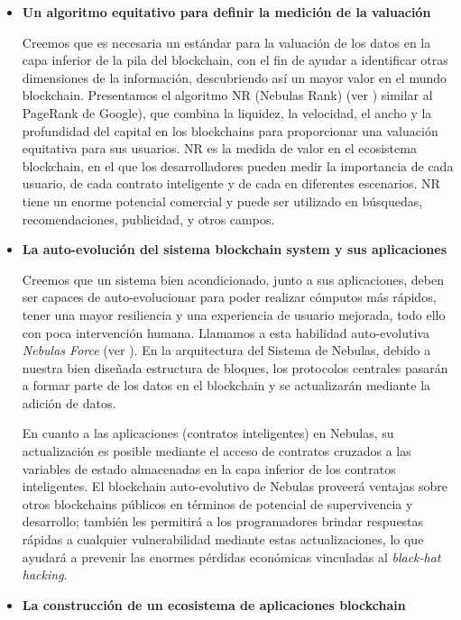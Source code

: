 \begin{itemize}
	\item \textbf{Un algoritmo equitativo para definir la medición de la valuación}

Creemos que es necesaria un estándar para la valuación de los datos en la capa inferior de la pila del blockchain, con el fin de ayudar a identificar otras dimensiones de la información, descubriendo así un mayor valor en el mundo blockchain. Presentamos el algoritmo NR (Nebulas Rank) (ver ) similar al PageRank \cite{Brin2010}\cite{page1999pagerank} de Google), que combina la liquidez, la velocidad, el ancho y la profundidad del capital en los blockchains para proporcionar una valuación equitativa para sus usuarios. NR es la medida de valor en el ecosistema blockchain, en el que los desarrolladores pueden medir la importancia de cada usuario, de cada contrato inteligente y de cada {\dapp} en diferentes escenarios. NR tiene un enorme potencial comercial y puede ser utilizado en búsquedas, recomendaciones, publicidad, y otros campos.

\item \textbf{La auto-evolución del sistema blockchain system y sus aplicaciones}

Creemos que un sistema bien acondicionado, junto a sus aplicaciones, deben ser capaces de auto-evolucionar para poder realizar cómputos más rápidos, tener una mayor resiliencia y una experiencia de usuario mejorada, todo ello con poca intervención humana. Llamamos a esta habilidad auto-evolutiva \textit{Nebulas Force} (ver ). En la arquitectura del Sistema de Nebulas, debido a nuestra bien diseñada estructura de bloques, los protocolos centrales pasarán a formar parte de los datos en el blockchain y se actualizarán mediante la adición de datos.

En cuanto a las aplicaciones (contratos inteligentes) en Nebulas, su actualización es posible mediante el acceso de contratos cruzados a las variables de estado almacenadas en la capa inferior de los contratos inteligentes. El blockchain auto-evolutivo de Nebulas proveerá ventajas sobre otros blockchains públicos en términos de potencial de supervivencia y desarrollo; también les permitirá a los programadores brindar respuestas rápidas a cualquier vulnerabilidad mediante estas actualizaciones, lo que ayudará a prevenir las enormes pérdidas económicas vinculadas al \textit{black-hat hacking}.

\item \textbf{La construcción de un ecosistema de aplicaciones blockchain}


\end{itemize}
